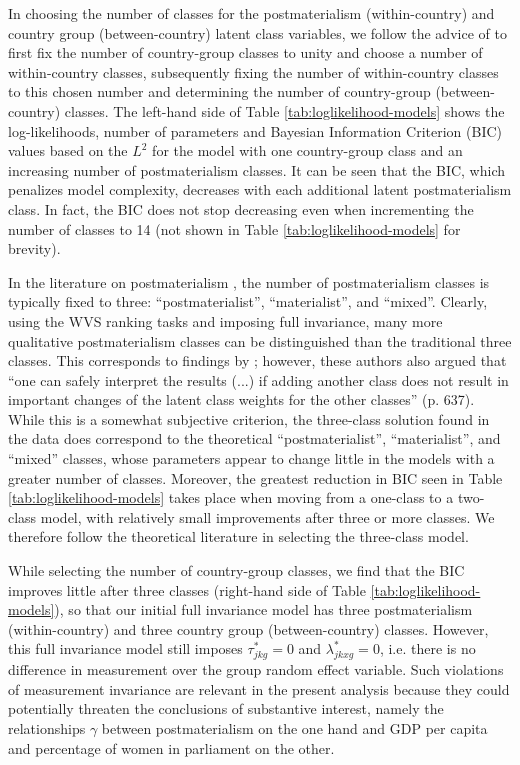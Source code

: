 \documentclass[letterpaper,12pt]{article}
\begin{document}
In choosing the number of classes for the postmaterialism (within-country) and country group (between-country) latent class variables, we follow the advice of \citet{lukovciene2010simultaneous} to first fix the number of country-group classes to unity and choose a number of within-country classes, subsequently fixing the number of within-country classes to this chosen number and determining the number of country-group (between-country) classes. The left-hand side of Table \ref{tab:loglikelihood-models} shows the log-likelihoods, number of parameters and Bayesian Information Criterion (BIC) values based on the $L^2$ for the model with one country-group class and an increasing number of postmaterialism classes. It can be seen that the BIC, which penalizes model complexity, decreases with each additional latent postmaterialism class. In fact, the BIC does not stop decreasing even when incrementing the number of classes to 14 (not shown in Table \ref{tab:loglikelihood-models} for brevity). 

In the literature on postmaterialism \citep[e.g.][]{inglehart1997modernization,inglehart2002gender,inglehart2010changing}, the number of postmaterialism classes is typically fixed to three: ``postmaterialist'', ``materialist'', and ``mixed''. Clearly, using the WVS ranking tasks and imposing full invariance, many more qualitative postmaterialism classes can be distinguished than the traditional three classes. This corresponds to findings by \citet{moors2007heterogeneity}; however, these authors \citep[following][]{hagenaars1990categorical} also argued that ``one can safely interpret the results (...) if adding another class does not result in important changes of the latent class weights for the other classes'' (p. 637). While this is a somewhat subjective criterion, the three-class solution found in the data does correspond to  the theoretical ``postmaterialist'', ``materialist'', and ``mixed'' classes, whose  parameters appear to change little in the models with a greater number of classes. Moreover, the greatest reduction in BIC seen in Table \ref{tab:loglikelihood-models} takes place when moving from a one-class to a two-class model, with relatively small improvements after three or more classes. We therefore follow the theoretical literature in selecting the three-class model.

While selecting the number of country-group classes, we find that the BIC improves little after three classes (right-hand side of Table \ref{tab:loglikelihood-models}), so that our initial full invariance model has three postmaterialism (within-country) and three country group (between-country) classes. However, this full invariance model still imposes $\tau^*_{jkg} = 0$ and $\lambda^*_{jkxg} = 0$, i.e. there is no difference in measurement over the group random effect variable. Such violations of measurement invariance are relevant in the present analysis because they could potentially threaten the conclusions of substantive interest, namely the relationships $\gamma$ between postmaterialism on the one hand and GDP per capita and percentage of women in parliament on the other. 
\end{document}
